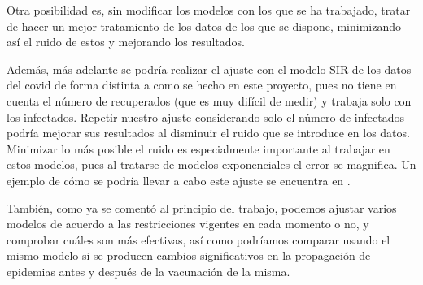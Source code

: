 Otra posibilidad es, sin modificar los modelos con los que se ha trabajado, tratar de hacer un mejor tratamiento de los datos de los que se dispone, minimizando así el ruido de estos y mejorando los resultados.

Además, más adelante se podría realizar el ajuste con el modelo SIR de los datos del covid de forma distinta a como se hecho en este proyecto, pues no tiene en cuenta el número de recuperados (que es muy difícil de medir) y trabaja solo con los infectados. Repetir nuestro ajuste considerando solo el número de infectados podría mejorar sus resultados al disminuir el ruido que se introduce en los datos. Minimizar lo más posible el ruido es especialmente importante al trabajar en estos modelos, pues al tratarse de modelos exponenciales el error se magnifica. Un ejemplo de cómo se podría llevar a cabo este ajuste se encuentra en \cite{enrique_amaro}.

También, como ya se comentó al principio del trabajo, podemos ajustar varios modelos de acuerdo a las restricciones vigentes en cada momento o no, y comprobar cuáles son más efectivas, así como podríamos comparar usando el mismo modelo si se producen cambios significativos en la propagación de epidemias antes y después de la vacunación de la misma.








